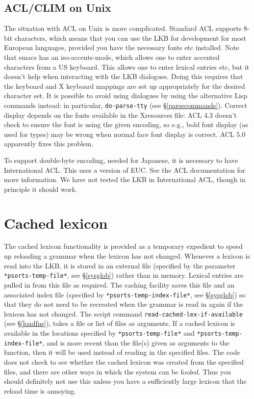 \documentclass[12pt]{report}
\begin{document}
\subsection{ACL/CLIM on Unix}

The situation with
ACL on Unix is more complicated.  Standard ACL supports 8-bit 
characters, which
means that you can use the LKB for development for most European languages,
provided you have the necessary fonts etc installed.  Note that emacs has an
iso-accents-mode, which allows one to enter accented characters from a US
keyboard.  This allows one to enter lexical entries etc, but it doesn't help
when interacting with the LKB dialogues.  
Doing this requires that the keyboard and X keyboard mappings are
set up appropriately for the desired character set.
It is possible to avoid using dialogues
by using the alternative Lisp commands
instead: in particular, {\tt do-parse-tty} (see
\S\ref{parsecommands}).  Correct display depends on the fonts available in
the Xresources file: ACL 4.3 doesn't check to ensure the font
is using the given encoding, so e.g., bold font display (as used for types)
may be wrong when normal face font display is correct.  ACL 5.0
apparently fixes this problem.

To support double-byte encoding, needed for Japanese, it is necessary to have
International ACL.  This uses a version of EUC.  See the ACL documentation for
more information.  We have not tested the LKB in International ACL,
though in principle it should work.

\section{Cached lexicon}
\label{cache}

The cached lexicon functionality is provided as a temporary expedient to speed
up reloading a grammar when the lexicon has not changed.  Whenever a lexicon is
read into the LKB, it is stored in an external file (specified by the
parameter \verb+*psorts-temp-file*+, see \S\ref{sysglob}) 
rather than in memory.  
Lexical entries
are pulled in from this file as required.  The caching facility saves this file
and an associated index file (specified by \verb+*psorts-temp-index-file*+, 
see \S\ref{sysglob}) so
that they do not need to be recreated when the grammar is read in again if the
lexicon has not changed.  The script command {\tt read-cached-lex-if-available}
(see \S\ref{loadfns}), takes a file or list of files as arguments.  If a cached
lexicon is available in the locations specified by \verb+*psorts-temp-file*+
and \verb+*psorts-temp-index-file*+, and is more recent than the file(s) given
as arguments to the function, then it will be used instead of reading in the
specified files.  The code does not check to see whether the cached lexicon was
created from the specified files, and there are other ways in which the system
can be fooled.  Thus you should definitely not use this unless you have
a sufficiently large lexicon that the reload time is annoying.
\end{document}
